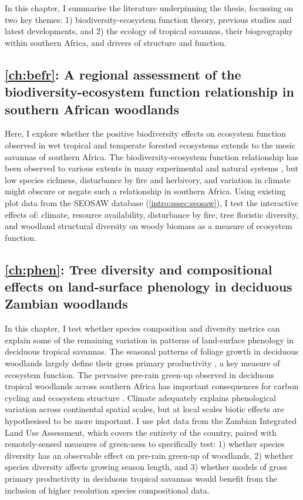 \begin{refsection}
In this chapter, I summarise the literature underpinning the thesis, focussing on two key themes: 1) biodiversity-ecosystem function theory, previous studies and latest developments, and 2) the ecology of tropical savannas, their biogeography within southern Africa, and drivers of structure and function.

\subsection{\autoref{ch:befr}: A regional assessment of the biodiversity-ecosystem function relationship in southern African woodlands}
\label{intro:ssec:ch:befr}

Here, I explore whether the positive biodiversity effects on ecosystem function observed in wet tropical and temperate forested ecosystems extends to the mesic savannas of southern Africa. The biodiversity-ecosystem function relationship has been observed to various extents in many experimental and natural systems \citep{Tilman2014, Plas2019}, but low species richness, disturbance by fire and herbivory, and variation in climate might obscure or negate such a relationship in southern Africa. Using existing plot data from the SEOSAW database (\autoref{intro:sssec:seosaw}), I test the interactive effects of: climate, resource availability, disturbance by fire, tree floristic diversity, and woodland structural diversity on woody biomass as a measure of ecosystem function.

\subsection{\autoref{ch:phen}: Tree diversity and compositional effects on land-surface phenology in deciduous Zambian woodlands}
\label{intro:ssec:ch:phen}

In this chapter, I test whether species composition and diversity metrics can explain some of the remaining variation in patterns of land-surface phenology in deciduous tropical savannas. The seasonal patterns of foliage growth in deciduous woodlands largely define their gross primary productivity \citep{Penuelas2009}, a key measure of ecosystem function. The pervasive pre-rain green-up observed in deciduous tropical woodlands across southern Africa \citep{Ryan2016} has important consequences for carbon cycling and ecosystem structure \citep{Xia2015}. Climate adequately explains phenological variation across continental spatial scales, but at local scales biotic effects are hypothesised to be more important. I use plot data from the Zambian Integrated Land Use Assessment, which covers the entirety of the country, paired with remotely-sensed measures of green-ness to specifically test: 1) whether species diversity has an observable effect on pre-rain green-up of woodlands, 2) whether species diversity affects growing season length, and 3) whether models of gross primary productivity in deciduous tropical savannas would benefit from the inclusion of higher resolution species compositional data.


\end{refsection}
